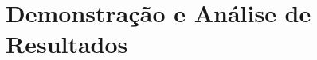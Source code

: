 \documentclass{article}
\begin{document}
\section{Demonstração e Análise de Resultados}





% 

\end{document}
